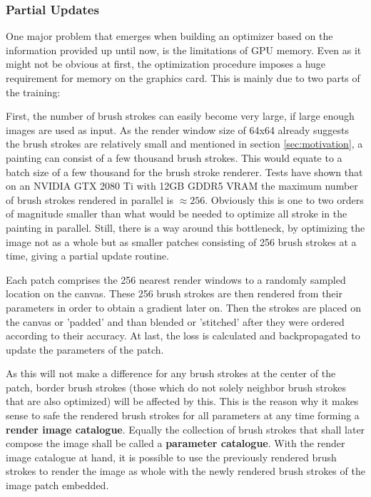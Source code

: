 \subsubsection{Partial Updates}

One major problem that emerges when building an optimizer based on the information
provided up until now, is the limitations of GPU memory.
Even as it might not be obvious at first, the optimization procedure imposes a huge
requirement for memory on the graphics card.
This is mainly due to two parts of the training:

First, the number of brush strokes can easily become very large, if large enough
images are used as input.
As the render window size of 64x64 already suggests the brush strokes are relatively
small and mentioned in section \ref{sec:motivation}, a painting can consist of a
few thousand brush strokes.
This would equate to a batch size of a few thousand for the brush stroke renderer.
Tests have shown that on an NVIDIA GTX 2080 Ti with 12GB GDDR5 VRAM the maximum number
of brush strokes rendered in parallel is $\approx 256$.
Obviously this is one to two orders of magnitude smaller than what would be needed
to optimize all stroke in the painting in parallel.
Still, there is a way around this bottleneck, by optimizing the image not as a whole
but as smaller patches consisting of 256 brush strokes at a time, giving a partial
update routine.

Each patch comprises the 256 nearest render windows to a randomly sampled location
on the canvas.
These 256 brush strokes are then rendered from their parameters in order to obtain
a gradient later on.
Then the strokes are placed on the canvas or 'padded' and than blended or 'stitched'
after they were ordered according to their accuracy.
At last, the loss is calculated and backpropagated to update the parameters of the patch.

As this will not make a difference for any brush strokes at the center of the patch,
border brush strokes (those which do not solely neighbor brush strokes that are also
optimized) will be affected by this.
This is the reason why it makes sense to safe the rendered brush strokes for all
parameters at any time forming a \textbf{render image catalogue}.
Equally the collection of brush strokes that shall later compose the image shall
be called a \textbf{parameter catalogue}.
With the render image catalogue at hand, it is possible to use the previously rendered
brush strokes to render the image as whole with the newly rendered brush strokes
of the image patch embedded.

